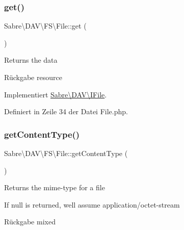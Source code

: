\mbox{\label{class_sabre_1_1_d_a_v_1_1_f_s_1_1_file_aee10f79224dfccf81bf9ca61e3cfba43}} 
\subsubsection{\texorpdfstring{get()}{get()}}
{\footnotesize\ttfamily Sabre\textbackslash{}\+D\+A\+V\textbackslash{}\+F\+S\textbackslash{}\+File\+::get (\begin{DoxyParamCaption}{ }\end{DoxyParamCaption})}

Returns the data

\begin{DoxyReturn}{Rückgabe}
resource 
\end{DoxyReturn}


Implementiert \mbox{\hyperlink{interface_sabre_1_1_d_a_v_1_1_i_file_a3102812af0567c3cfd9cd6c20104bd27}{Sabre\textbackslash{}\+D\+A\+V\textbackslash{}\+I\+File}}.



Definiert in Zeile 34 der Datei File.\+php.

\mbox{\label{class_sabre_1_1_d_a_v_1_1_f_s_1_1_file_aca06c255562df9fc5b200760d29424d2}} 
\subsubsection{\texorpdfstring{get\+Content\+Type()}{getContentType()}}
{\footnotesize\ttfamily Sabre\textbackslash{}\+D\+A\+V\textbackslash{}\+F\+S\textbackslash{}\+File\+::get\+Content\+Type (\begin{DoxyParamCaption}{ }\end{DoxyParamCaption})}

Returns the mime-\/type for a file

If null is returned, we\textquotesingle{}ll assume application/octet-\/stream

\begin{DoxyReturn}{Rückgabe}
mixed 
\end{DoxyReturn}


